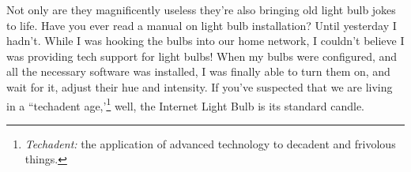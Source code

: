 Not only are they magnificently useless they're also bringing old light
bulb jokes to life. Have you ever read a manual on light bulb
installation? Until yesterday I hadn't. While I was hooking the bulbs
into our home network, I couldn't believe I was providing tech support
for light bulbs! When my bulbs were configured, and all the necessary
software was installed, I was finally able to turn them on, and wait for
it, adjust their hue and intensity. If you've suspected that we are
living in a ``techadent
age,'\footnote{\emph{Techadent:} the application of advanced technology to decadent
  and frivolous things.
}%
well, the Internet Light Bulb is its standard candle.





%

